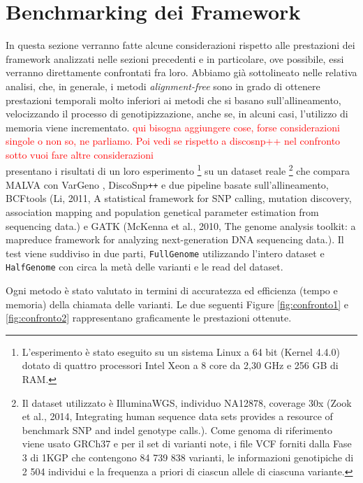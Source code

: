\documentclass[../main.tex]{subfiles}
\begin{document}
\section{Benchmarking dei Framework}

In questa sezione verranno fatte alcune considerazioni rispetto alle prestazioni dei framework analizzati nelle sezioni precedenti e in particolare, ove possibile, essi verranno direttamente confrontati fra loro. Abbiamo già sottolineato nelle relativa analisi, che, in generale, i metodi \textit{alignment-free} sono in grado di ottenere prestazioni temporali molto inferiori ai metodi che si basano sull'allineamento, velocizzando il processo di genotipizzazione, anche se, in alcuni casi, l'utilizzo di memoria viene incrementato. \textcolor{red}{qui bisogna aggiungere cose, forse considerazioni singole o non so, ne parliamo. Poi vedi se rispetto a discosnp++ nel confronto sotto vuoi fare altre considerazioni}\\

\noindent
\cite{bernardini2019malva} presentano i risultati di un loro esperimento \footnote{L'esperimento è stato eseguito su un sistema Linux a 64 bit (Kernel 4.4.0) dotato di quattro processori Intel Xeon a 8 core da 2,30 GHz e 256 GB di RAM.} su un dataset reale \footnote{Il dataset utilizzato è IlluminaWGS, individuo NA12878, coverage 30x (Zook et al., 2014, Integrating human sequence data sets provides a resource of benchmark SNP and indel genotype calls.). Come genoma di riferimento viene usato GRCh37 e per il set di varianti note, i file VCF forniti dalla Fase 3 di 1KGP che contengono  84 739 838 varianti, le informazioni genotipiche di 2 504 individui e la frequenza a priori di ciascun allele di ciascuna variante.} che compara MALVA con VarGeno \cite{sun-medvedev2018vargeno}, DiscoSnp\texttt{++} \cite{peterlongo2017discosnp++} e due pipeline basate sull'allineamento, BCFtools (Li, 2011, A statistical framework for SNP calling, mutation discovery, association mapping and population genetical parameter estimation from sequencing data.) e GATK (McKenna et al., 2010, The genome analysis toolkit: a mapreduce framework for analyzing next-generation DNA sequencing data.). Il test viene suddiviso in due parti, \texttt{FullGenome} utilizzando l'intero dataset e \texttt{HalfGenome} con circa la metà delle varianti e le read del dataset.


Ogni metodo è stato valutato in termini di accuratezza ed efficienza (tempo e memoria) della chiamata delle varianti. Le due seguenti Figure \ref{fig:confronto1} e \ref{fig:confronto2} rappresentano graficamente le prestazioni ottenute.
\end{document}
